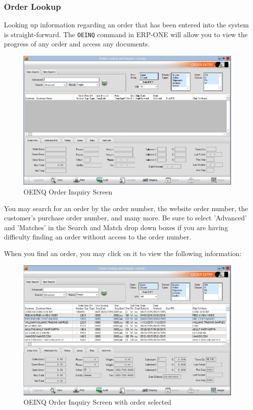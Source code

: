 \subsubsection{Order Lookup}


Looking up information regarding an order that has been entered into the system is straight-forward. The \texttt{OEINQ} command in ERP-ONE will allow you to view the progress of any order and access any documents.

\begin{figure}[H]
	\includegraphics[width=\textwidth]{../img/image5}
	\caption{OEINQ Order Inquiry Screen}
\end{figure}

You may search for an order by the order number, the website order number, the customer's purchase order number, and many more.  Be sure to select 'Advanced' and 'Matches' in the Search and Match drop down boxes if you are having difficulty finding an order without access to the order number.

When you find an order, you may click on it to view the following information:

\begin{figure}[H]
	\includegraphics[width=\textwidth]{../img/image6}
	\caption{OEINQ Order Inquiry Screen with order selected}
\end{figure}

